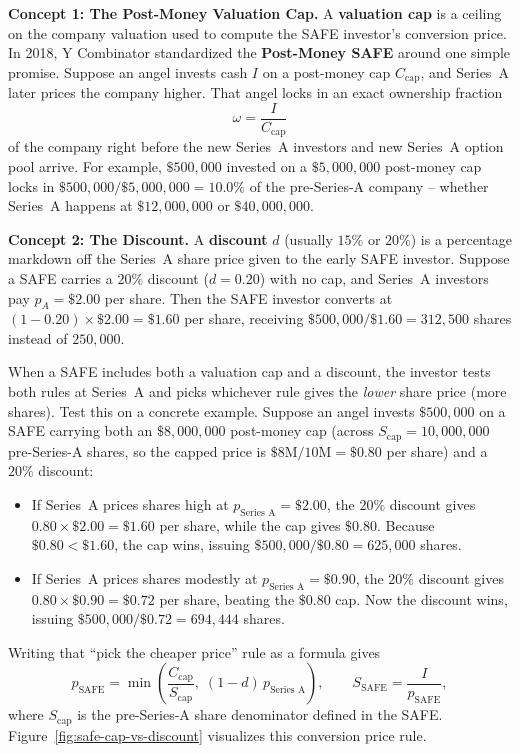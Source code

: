 \textbf{Concept 1: The Post-Money Valuation Cap.} A \textbf{valuation cap} is a ceiling on the company valuation used to compute the SAFE investor's conversion price. In 2018, Y Combinator standardized the \textbf{Post-Money SAFE} around one simple promise. Suppose an angel invests cash $I$ on a post-money cap $C_{\text{cap}}$, and Series~A later prices the company higher. That angel locks in an exact ownership fraction
\[
  \omega = \frac{I}{C_{\text{cap}}}
\]
of the company right before the new Series~A investors and new Series~A option pool arrive. For example, $\$500{,}000$ invested on a $\$5{,}000{,}000$ post-money cap locks in $\$500{,}000 / \$5{,}000{,}000 = 10.0\%$ of the pre-Series-A company -- whether Series~A happens at $\$12{,}000{,}000$ or $\$40{,}000{,}000$.

\textbf{Concept 2: The Discount.} A \textbf{discount} $d$ (usually $15\%$ or $20\%$) is a percentage markdown off the Series~A share price given to the early SAFE investor. Suppose a SAFE carries a $20\%$ discount ($d = 0.20$) with no cap, and Series~A investors pay $p_A = \$2.00$ per share. Then the SAFE investor converts at $(1 - 0.20) \times \$2.00 = \$1.60$ per share, receiving $\$500{,}000 / \$1.60 = 312{,}500$ shares instead of $250{,}000$.

When a SAFE includes both a valuation cap and a discount, the investor tests both rules at Series~A and picks whichever rule gives the \emph{lower} share price (more shares). Test this on a concrete example. Suppose an angel invests $\$500{,}000$ on a SAFE carrying both an $\$8{,}000{,}000$ post-money cap (across $S_{\text{cap}} = 10{,}000{,}000$ pre-Series-A shares, so the capped price is $\$8\text{M} / 10\text{M} = \$0.80$ per share) and a $20\%$ discount:
\begin{itemize}
  \item If Series~A prices shares high at $p_{\text{Series A}} = \$2.00$, the $20\%$ discount gives $0.80 \times \$2.00 = \$1.60$ per share, while the cap gives $\$0.80$. Because $\$0.80 < \$1.60$, the cap wins, issuing $\$500{,}000 / \$0.80 = 625{,}000$ shares.
  \item If Series~A prices shares modestly at $p_{\text{Series A}} = \$0.90$, the $20\%$ discount gives $0.80 \times \$0.90 = \$0.72$ per share, beating the $\$0.80$ cap. Now the discount wins, issuing $\$500{,}000 / \$0.72 = 694{,}444$ shares.
\end{itemize}
Writing that ``pick the cheaper price'' rule as a formula gives
\begin{equation}\label{eq:safe-conversion-price}
  p_{\text{SAFE}} = \min\!\left(\frac{C_{\text{cap}}}{S_{\text{cap}}},\; (1 - d)\,p_{\text{Series A}}\right),
  \qquad
  S_{\text{SAFE}} = \frac{I}{p_{\text{SAFE}}},
\end{equation}
where $S_{\text{cap}}$ is the pre-Series-A share denominator defined in the SAFE. Figure~\ref{fig:safe-cap-vs-discount} visualizes this conversion price rule.

